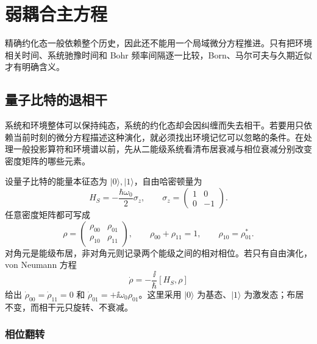 \section{弱耦合主方程}
\label{chap:born-markov-gksl}

精确约化态一般依赖整个历史，因此还不能用一个局域微分方程推进。只有把环境相关时间、系统驰豫时间和 Bohr 频率间隔逐一比较，Born、马尔可夫与久期近似才有明确含义。

\subsection{量子比特的退相干}

系统和环境整体可以保持纯态，系统的约化态却会因纠缠而失去相干。若要用只依赖当前时刻的微分方程描述这种演化，就必须找出环境记忆可以忽略的条件。在处理一般投影算符和环境谱以前，先从二能级系统看清布居衰减与相位衰减分别改变密度矩阵的哪些元素。

设量子比特的能量本征态为 \(\lvert0\rangle,\lvert1\rangle\)，自由哈密顿量为
\[
 H_S=-\frac{\hbar\omega_0}{2}\sigma_z,
 \qquad
 \sigma_z=\begin{pmatrix}1&0\\0&-1\end{pmatrix}.
\]
任意密度矩阵都可写成
\[
 \rho=
 \begin{pmatrix}
 \rho_{00}&\rho_{01}\\
 \rho_{10}&\rho_{11}
 \end{pmatrix},
 \qquad
 \rho_{00}+\rho_{11}=1,
 \qquad
 \rho_{10}=\rho_{01}^*.
\]
对角元是能级布居，非对角元则记录两个能级之间的相对相位。若只有自由演化，von Neumann 方程
\[
 \dot\rho=-\frac{\ii}{\hbar}[H_S,\rho]
\]
给出 \(\dot\rho_{00}=\dot\rho_{11}=0\) 和 \(\dot\rho_{01}=+\ii\omega_0\rho_{01}\)。这里采用 \(\lvert0\rangle\) 为基态、\(\lvert1\rangle\) 为激发态；布居不变，而相干元只旋转、不衰减。

\subsubsection{相位翻转}

